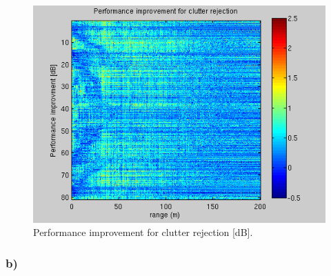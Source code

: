 \documentclass{article}
\begin{document}
\begin{figure}[htb]
\begin{minipage}[b]{0.33\linewidth}
\includegraphics[width=\textwidth]{Figures/improvement_31.png}
\caption{Performance improvement for clutter rejection [dB].}
\label{fig:improvement_31}
\end{minipage}
\end{figure}

\subsubsection{b)}
\end{document}
